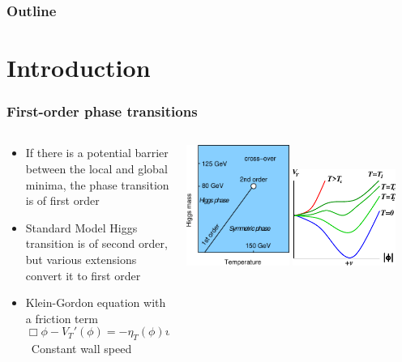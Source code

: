 \begin{frame}
    \titlepage
\end{frame}

\begin{frame}
    \frametitle{Outline}
    \tableofcontents
\end{frame}

\section{Introduction}

\begin{frame}
    \frametitle{First-order phase transitions}
    \begin{columns}
    \begin{column}{0.5\textwidth}
        \begin{itemize}
            \item If there is a potential barrier between the local and global minima, the phase transition is of first order
            \item Standard Model Higgs transition is of second order, but various extensions convert it to first order
            \item Klein-Gordon equation with a friction term
            \begin{equation}
                \Box \phi - V_T'(\phi) = - \eta_T(\phi) u^\mu \partial_\mu \phi
            \end{equation}
            \textrightarrow \ Constant wall speed
        \end{itemize}
    \end{column}
    \begin{column}{0.5\textwidth}
        \includegraphics[width=0.45\textwidth]{../fig/smPhaseDiag2}%
        \hfill%
        \includegraphics[width=0.45\textwidth]{../fig/ThermalHiggsPotential}
    \end{column}
    \end{columns}
\end{frame}

